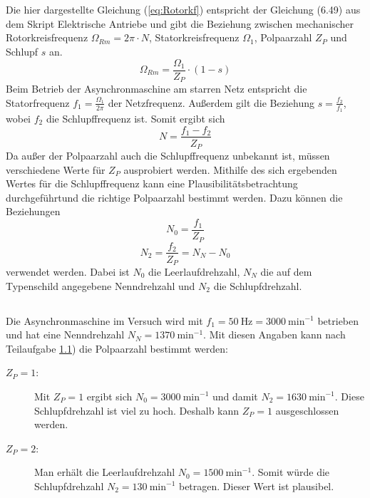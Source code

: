 \chapter{}\label{ex:aufg4}
%
\section{}\label{sec:aufg4a}
Die hier dargestellte Gleichung (\ref{eq:Rotorkf}) entspricht der Gleichung (6.49) aus dem Skript Elektrische Antriebe und gibt die Beziehung zwischen mechanischer Rotorkreisfrequenz $\Omega_{Rm} = 2\pi \cdot N$, Statorkreisfrequenz $\Omega_1$, Polpaarzahl $Z_P$ und Schlupf $s$ an.
\begin{equation}
	\Omega_{Rm} = \frac{\Omega_1}{Z_P}\cdot (1-s)
	\label{eq:Rotorkf}
\end{equation}
Beim Betrieb der Asynchronmaschine am starren Netz entspricht die Statorfrequenz $f_1 = \frac{\Omega_1}{2\pi}$ der Netzfrequenz. Außerdem gilt die Beziehung $s = \frac{f_2}{f_1}$, wobei $f_2$ die Schlupffrequenz ist. Somit ergibt sich
\begin{equation}
	N = \frac{f_1 - f_2}{Z_P}
	\label{eq:Drehzahl}
\end{equation}
Da außer der Polpaarzahl auch die Schlupffrequenz unbekannt ist, müssen verschiedene Werte für $Z_P$ ausprobiert werden. Mithilfe des sich ergebenden Wertes für die Schlupffrequenz kann eine Plausibilitätsbetrachtung durchgeführtund die richtige Polpaarzahl bestimmt werden. Dazu können die Beziehungen
\begin{equation}
    N_0 = \frac{f_1}{Z_P}
\end{equation}
\begin{equation}
    N_2 = \frac{f_2}{Z_P} = N_N - N_0
\end{equation}
verwendet werden. Dabei ist $N_0$ die Leerlaufdrehzahl, $N_N$ die auf dem Typenschild angegebene Nenndrehzahl und $N_2$ die Schlupfdrehzahl.

\section{}\label{sec:aufg4b}
Die Asynchronmaschine im Versuch wird mit $f_1 = 50~\text{Hz} = 3000~\text{min}^{-1}$ betrieben und hat eine Nenndrehzahl $N_N = 1370~\text{min}^{-1}$. Mit diesen Angaben kann nach Teilaufgabe \ref{sec:aufg4a}) die Polpaarzahl bestimmt werden:
\begin{description}
    \item[$Z_P = 1$:] Mit $Z_P = 1$ ergibt sich $N_0 = 3000~\text{min}^{-1}$ und damit $N_2 = 1630~\text{min}^{-1}$. Diese Schlupfdrehzahl ist viel zu hoch. Deshalb kann $Z_P = 1$ ausgeschlossen werden.
    \item[$Z_P = 2$:] Man erhält die Leerlaufdrehzahl $N_0 = 1500~\text{min}^{-1}$. Somit würde die Schlupfdrehzahl $N_2 = 130~\text{min}^{-1}$ betragen. Dieser Wert ist plausibel.
\end{description}